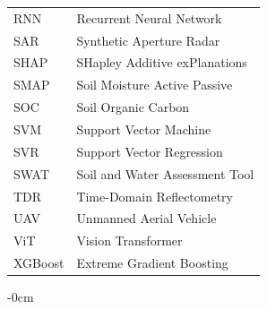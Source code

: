 \documentclass[land,article,submit,pdftex,moreauthors]{Definitions/mdpi}
\numberwithin{equation}{section}
\begin{document}
{\begin{tabular}{@{}ll}
RNN  & Recurrent Neural Network\\
SAR  & Synthetic Aperture Radar\\
SHAP & SHapley Additive exPlanations\\
SMAP & Soil Moisture Active Passive\\
SOC  & Soil Organic Carbon\\
SVM  & Support Vector Machine\\
SVR  & Support Vector Regression\\
SWAT & Soil and Water Assessment Tool\\
TDR  & Time-Domain Reflectometry\\
UAV  & Unmanned Aerial Vehicle\\
ViT  & Vision Transformer\\
XGBoost & Extreme Gradient Boosting\\
\end{tabular}
}

\begin{adjustwidth}{-\extralength}{0cm}





\end{adjustwidth}
\end{document}
